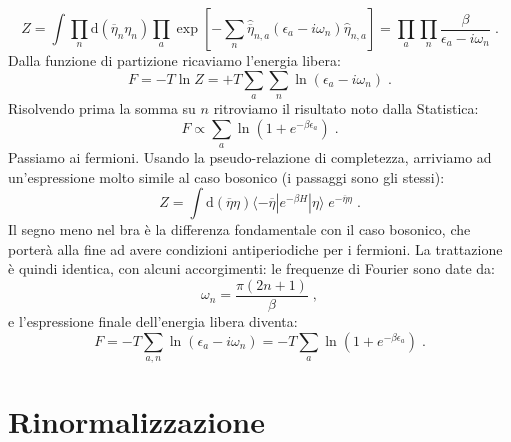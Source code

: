 \documentclass[12pt,a4paper]{article}
\theoremstyle{definition}
\numberwithin{equation}{section}
\newcommand{\diff}[1][]{\mathrm{d}#1}
\newcommand{\bra}{\langle}
\newcommand{\ket}{\rangle}
\begin{document}
\begin{equation}
Z=\int\prod_n\diff{(\overline{\eta}_n\eta_n)}\prod_a\exp\left[-\sum_n\hat{\overline{\eta}}_{n,a}(\epsilon_a-i\omega_n)\hat{\eta}_{n,a}\right]=\prod_a\prod_n\frac{\beta}{\epsilon_a-i\omega_n}\;.
\end{equation}
Dalla funzione di partizione ricaviamo l'energia libera:
\begin{equation}
F=-T\ln Z=+T\sum_a\sum_n\ln(\epsilon_a-i\omega_n)\;.
\end{equation}
Risolvendo prima la somma su $n$ ritroviamo il risultato noto dalla Statistica:
$$
F\propto\sum_a\ln(1+e^{-\beta\epsilon_a})\;.
$$
Passiamo ai fermioni. Usando la pseudo-relazione di completezza, arriviamo ad un'espressione molto simile al caso bosonico (i passaggi sono gli stessi):
\begin{equation}
Z=\int\diff{(\overline{\eta}\eta)}\bra -\overline{\eta}|e^{-\beta H}|\eta\ket\;e^{-\overline{\eta}\eta}\;.
\end{equation}
Il segno meno nel bra è la differenza fondamentale con il caso bosonico, che porterà alla fine ad avere condizioni antiperiodiche per i fermioni. La trattazione è quindi identica, con alcuni accorgimenti: le frequenze di Fourier sono date da:
$$
\omega_n=\frac{\pi(2n+1)}{\beta}\;,
$$
e l'espressione finale dell'energia libera diventa:
\begin{equation}
F=-T\sum_{a,n}\ln(\epsilon_a-i\omega_n)=-T\sum_a\ln(1+e^{-\beta\epsilon_a})\;.
\end{equation}
\section{Rinormalizzazione}
\end{document}
